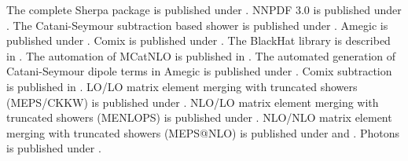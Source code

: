 \documentclass{article}
\begin{document}
The complete Sherpa package is published under \cite{Gleisberg:2008ta}.
NNPDF 3.0 is published under \cite{Ball:2014uwa}.
The Catani-Seymour subtraction based shower is published under \cite{Schumann:2007mg}.
Amegic is published under \cite{Krauss:2001iv}.
Comix is published under \cite{Gleisberg:2008fv}.
The BlackHat library is described in \cite{Berger:2008sj}.
The automation of MCatNLO is published in \cite{Hoeche:2011fd}.
The automated generation of Catani-Seymour dipole terms in Amegic is published under \cite{Gleisberg:2007md}.
Comix subtraction is published in \cite{Hoeche:2012xx}.
LO/LO matrix element merging with truncated showers (MEPS/CKKW) is published under \cite{Hoeche:2009rj}.
NLO/LO matrix element merging with truncated showers (MENLOPS) is published under \cite{Hoeche:2010kg}.
NLO/NLO matrix element merging with truncated showers (MEPS@NLO) is published under \cite{Hoeche:2012yf} and \cite{Gehrmann:2012yg}.
Photons is published under \cite{Schonherr:2008av}.
\end{document}
